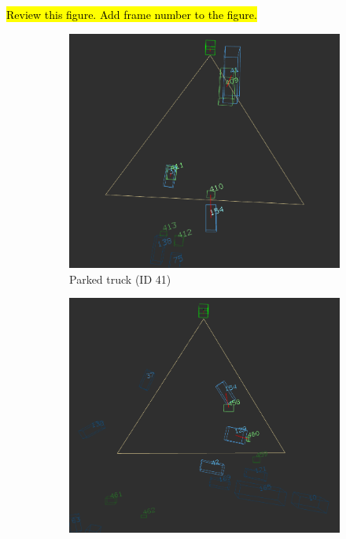 \hl{Review this figure. Add frame number to the figure.}
\begin{figure}[h!]
    \centering
    \begin{subfigure}[b]{0.32\textwidth}
        \includegraphics[width=\linewidth]{images/experiments/evaluation_frames/3d_evaluation_frame_2.png}
        \caption{Parked truck (ID 41)}
        \label{fig:scene_open3d_cases_a}
    \end{subfigure}
    \hfill
    \begin{subfigure}[b]{0.32\textwidth}
        \includegraphics[width=\textwidth]{images/experiments/evaluation_frames/3d_evaluation_frame_12.png}

\end{subfigure}
\end{figure}
